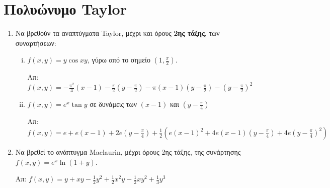 \section{Πολυώνυμο Taylor}

\begin{enumerate}
    \item Να βρεθούν τα αναπτύγματα Taylor, μέχρι και όρους 
        \textbf{2ης τάξης}, των συναρτήσεων:

        \begin{enumerate}[i)]
            \item  $f(x,y)=y\cos{xy} $, γύρω από το σημείο 
                $ \left(1, \frac{ \pi }{ 2 }\right) $.

                \hfill Απ: $f(x,y)=-\frac{\pi^{2}}{4}(x-1) - \frac{ \pi }{ 2 } 
                \left(y - \frac{ \pi }{2 }\right) - \pi(x-1)
                \left(y-\frac{\pi}{2}\right)- \left(y- \frac{ \pi }{ 2} \right)^{2} $

            \item $ f(x,y)=e^{x}\tan{y} $ σε δυνάμεις των $ (x-1) $ και 
                $ \left(y - \frac{ \pi }{ 4 }\right) $

                \hfill Απ: $ f(x,y) = e + e(x-1) + 2e\left(y- \frac{ \pi }{ 4 }\right)
                + \frac{1}{ 2 } \left(e(x-1)^{2}+4e(x-1)\left(y- \frac{ \pi }{ 4 }
                \right) + 4e\left(y- \frac{ \pi }{ 4 } \right)^{2}\right) $
        \end{enumerate}

    \item Να βρεθεί το ανάπτυγμα Maclaurin, μέχρι όρους 2ης τάξης, 
        της συνάρτησης $ f(x,y) = e^{x}\ln(1+y)$.

        \hfill Απ: $ f(x,y)=y + xy - \frac{1}{ 2 } y^{2} + \frac{1}{ 2 } x^{2}y - 
        \frac{1}{ 2 } xy^{2} + \frac{1}{ 3 } y^{3} $

\end{enumerate}
   
